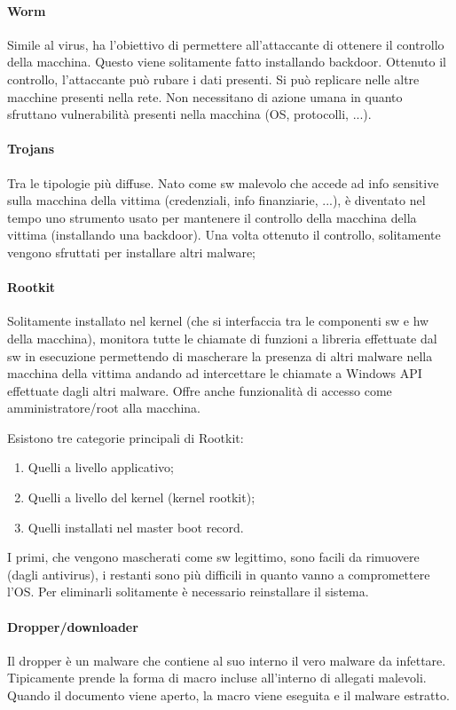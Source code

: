 \paragraph{Worm} Simile al virus, ha l'obiettivo di permettere all'attaccante di ottenere il controllo della macchina. Questo viene solitamente fatto installando backdoor. Ottenuto il controllo, l'attaccante può rubare i dati presenti. Si può replicare nelle altre macchine presenti nella rete. Non necessitano di azione umana in quanto sfruttano vulnerabilità presenti nella macchina (OS, protocolli, ...).

\paragraph{Trojans} Tra le tipologie più diffuse. Nato come sw malevolo che accede ad info sensitive sulla macchina della vittima (credenziali, info finanziarie, ...), è diventato nel tempo uno strumento usato per mantenere il controllo della macchina della vittima (installando una backdoor). Una volta ottenuto il controllo, solitamente vengono sfruttati per installare altri malware;
\paragraph{Rootkit} Solitamente installato nel kernel (che si interfaccia tra le componenti sw e hw della macchina), monitora tutte le chiamate di funzioni a libreria effettuate dal sw in esecuzione permettendo di mascherare la presenza di altri malware nella macchina della vittima andando ad intercettare le chiamate a Windows API effettuate dagli altri malware. Offre anche funzionalità di accesso come amministratore/root alla macchina.

Esistono tre categorie principali di Rootkit:
\begin{enumerate}
	\item Quelli a livello applicativo;
	\item Quelli a livello del kernel (kernel rootkit);
	\item Quelli  installati nel master boot record.
\end{enumerate}

I primi, che vengono mascherati come sw legittimo, sono facili da rimuovere (dagli antivirus), i restanti sono più difficili in quanto vanno a compromettere l'OS. Per eliminarli solitamente è necessario reinstallare il sistema.

\paragraph{Dropper/downloader} Il dropper è un malware che contiene al suo interno il vero malware da infettare. Tipicamente prende la forma di macro incluse all'interno di allegati malevoli. Quando il documento viene aperto, la macro viene eseguita e il malware estratto. 

